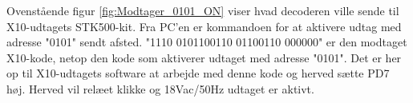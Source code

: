 Ovenstående figur \ref{fig:Modtager_0101_ON} viser hvad decoderen ville sende til X10-udtagets STK500-kit. Fra PC'en er kommandoen for at aktivere udtag med adresse "0101" sendt afsted.
"1110 0101100110 01100110 000000" er den modtaget X10-kode, netop den kode som aktiverer udtaget med adresse "0101". Det er her op til X10-udtagets software at arbejde med denne kode og herved sætte PD7 høj. Herved vil relæet klikke og 18Vac/50Hz udtaget er aktivt. 
